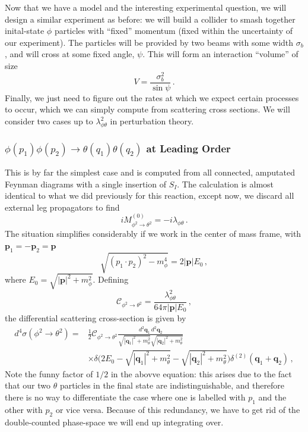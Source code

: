\documentclass{article}
\numberwithin{equation}{subsection}
\begin{document}
Now that we have a model and the interesting experimental question, we will design a similar experiment as before: we will build a collider to smash
together inital-state $\phi$ particles with ``fixed'' momentum (fixed within the uncertainty of our experiment). The particles will be provided by two
beams with some width $\sigma_b$, and will cross at some fixed angle, $\psi$. This will form an interaction ``volume'' of size
\begin{equation}
	V = \frac{\sigma_b^2}{\sin\psi}\,.
\end{equation}
Finally, we just need to figure out the rates at which we expect certain processes to occur, which we can simply compute from scattering cross sections.
We will consider two cases up to $\lambda_{\phi\theta}^2$ in perturbation theory.

\subsubsection{$\phi(p_1)\phi(p_2)\to\theta(q_1)\theta(q_2)$ at Leading Order}

This is by far the simplest case and is computed from all connected, amputated Feynman diagrams with a single insertion of $S_I$. The calculation is almost identical to
what we did previously for this reaction, except now, we discard all external leg propagators to find
\begin{equation}
	iM^{(0)}_{\phi^2\to\theta^2} = -i\lambda_{\phi\theta}\,.
\end{equation}
The situation simplifies considerably if we work in the center of mass frame, with $\mathbf{p}_1 = -\mathbf{p}_2 = \mathbf{p}$
\begin{equation}
	\sqrt{(p_1\cdot p_2)^2 - m_\phi^4} = 2|\mathbf{p}|E_0\,,
\end{equation}
where $E_0 = \sqrt{|\mathbf{p}|^2 + m_\phi^2}$. Defining
\begin{equation}
	\mathcal{C}_{\phi^2\to\theta^2} = \frac{\lambda_{\phi\theta}^2}{64\pi|\mathbf{p}|E_0}\,,
\end{equation}
the differential scattering cross-section is given by
\begin{equation}\begin{split}
	d^4\sigma(\phi^2\to\theta^2) =& \frac{1}{2}
		\mathcal{C}_{\phi^2\to\theta^2}\frac{d^2\mathbf{q}_1\,d^2\mathbf{q}_2}{\sqrt{|\mathbf{q}_1|^2 + m_\theta^2}\sqrt{|\mathbf{q}_2|^2 + m_\theta^2}}\\[0.5em]
		&\times\delta\Big(2 E_0 - \sqrt{|\mathbf{q}_1|^2 + m_\theta^2} - \sqrt{|\mathbf{q}_2|^2 + m_\theta^2}\Big)\delta^{(2)}(\mathbf{q}_1 + \mathbf{q}_2)\,,
\end{split}\end{equation}
Note the funny factor of $1/2$ in the abovve equation: this arises due to the fact that our two $\theta$ particles in the final state
are indistinguishable, and therefore there is no way to differentiate the case where one is labelled with $p_1$ and the other with $p_2$ or
vice versa. Because of this redundancy, we have to get rid of the double-counted phase-space we will end up integrating over.
\end{document}
